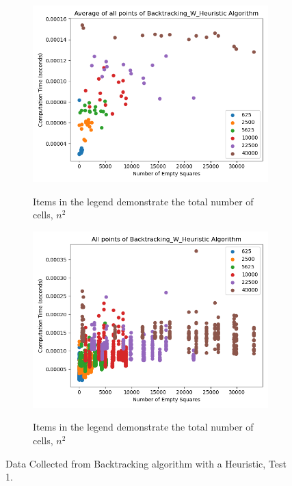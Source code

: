 \documentclass{article}
\begin{document}
\bigskip



\begin{figure}[!h]
	\centering
	\begin{subfigure}{0.4\textwidth}
		\centering
		\includegraphics[scale=0.4]{scatter_avg_Backtracking_w_Heuristic-1.png}
		\label{Test 1: Average of all points}
		\caption{Items in the legend demonstrate the total number of cells, $n^2$}
	\end{subfigure}
	\hfill
	\begin{subfigure}{0.4\textwidth}
		\centering
		\includegraphics[scale=0.4]{scatter_Backtracking_w_Heuristic-1.png}
		\label{Test 1: Scatter plot of all collected points}
		\caption{Items in the legend demonstrate the total number of cells, $n^2$}
	\end{subfigure}
	\caption{Data Collected from Backtracking algorithm with a Heuristic, Test 1.}
\end{figure}
\bigskip
\end{document}
